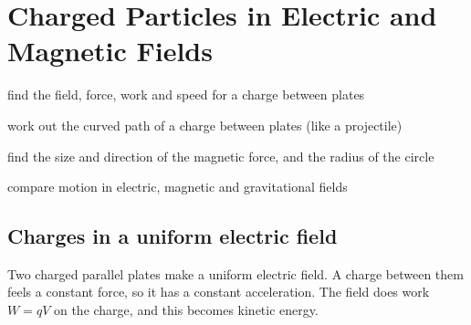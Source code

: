 \chapter{Charged Particles in Electric and Magnetic Fields}\label{ch1:chap}


\begin{goals}
  \item find the field, force, work and speed for a charge between plates
  \item work out the curved path of a charge between plates (like a projectile)
  \item find the size and direction of the magnetic force, and the radius of the circle
  \item compare motion in electric, magnetic and gravitational fields
\end{goals}


\section{Charges in a uniform electric field}\label{ch1:sec:efield}

\begin{bigidea}
Two charged parallel plates make a uniform electric field. A charge between
them feels a constant force, so it has a constant acceleration. The field does
work $W = qV$ on the charge, and this becomes kinetic energy.
\end{bigidea}

\begin{keywords}
\end{keywords}

